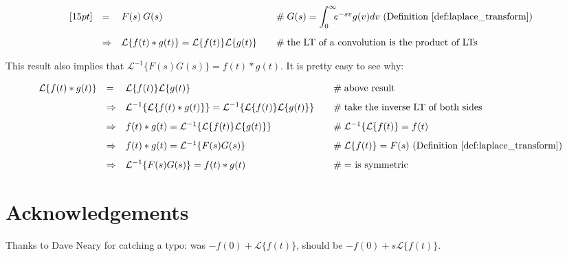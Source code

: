 \documentclass{article}
\theoremstyle{definition}
\begin{document}
\begin{equation*}
\begin{array}{lllll}
[15pt]
&=& F(s)\:G(s)                                                                                                                   &\quad \mathrel{\#} G(s) = \mathlarger{\int}^\infty_0 \!\! e^{-sv}  g(v) dv \text{ (Definition \ref{def:laplace_transform})}      \\   
[15pt]
&\Rightarrow& \mathcal{L}\{f(t) \ast g(t)\} = \mathcal{L}\{f(t)\}\mathcal{L}\{g(t)\}                                        &\quad \mathrel{\#} \text{the LT of a convolution is the product of LTs}                                                       \\
\end{array}
\end{equation*}

\bigskip
\bigskip
\noindent
This result also implies that $\mathcal{L}^{-1}\{F(s) G(s)\}  = f(t) \ast g(t)$. It is pretty easy to see why:

\bigskip
\begin{equation*}
\begin{array}{lllll}
\mathcal{L}\{f(t) \ast g(t)\} 
&=& \mathcal{L}\{f(t)\}\mathcal{L}\{g(t)\}                                                                                                                               &\quad \mathrel{\#} \text{above result}                                      \\
[8pt]
&\Rightarrow& \mathcal{L}^{-1}\{\mathcal{L}\{f(t) \ast g(t)\}\} =  \mathcal{L}^{-1}\{\mathcal{L}\{f(t)\}\mathcal{L}\{g(t)\}\}     &\quad \mathrel{\#} \text{take the inverse LT of both sides}       \\
[8pt]
&\Rightarrow& f(t) \ast g(t) =  \mathcal{L}^{-1}\{\mathcal{L}\{f(t)\}\mathcal{L}\{g(t)\}\}                                                          &\quad \mathrel{\#}   \mathcal{L}^{-1}\{\mathcal{L}\{f(t)\} = f(t)  \\
[8pt]
&\Rightarrow& f(t) \ast g(t) =  \mathcal{L}^{-1}\{F(s) G(s)\}                                                                                                  &\quad \mathrel{\#} \text{$\mathcal{L}\{f(t)\} = F(s)$ (Definition \ref{def:laplace_transform})} \\
[8pt]
&\Rightarrow& \mathcal{L}^{-1}\{F(s) G(s)\} = f(t) \ast g(t)                                                                                                  &\quad \mathrel{\#} \text{$=$ is symmetric}
\end{array}
\end{equation*}


\bigskip
\section*{Acknowledgements}
Thanks to Dave Neary for catching a typo: was $-f(0) + \mathcal{L}\{f(t)\}$, should be $-f(0) + s \mathcal{L}\{f(t)\} $.

\newpage


\end{document}
